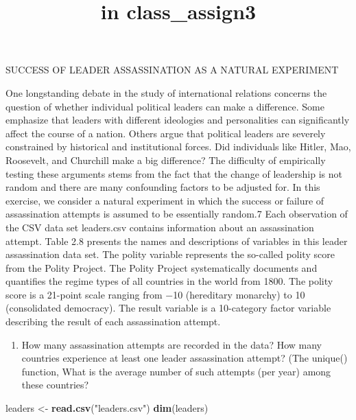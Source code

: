 \documentclass[
]{article}
\title{in class\_assign3}
\author{}
\date{\vspace{-2.5em}}
\newenvironment{Shaded}{\begin{snugshade}}{\end{snugshade}}
\newcommand{\KeywordTok}[1]{\textcolor[rgb]{0.13,0.29,0.53}{\textbf{#1}}}
\newcommand{\NormalTok}[1]{#1}
\newcommand{\StringTok}[1]{\textcolor[rgb]{0.31,0.60,0.02}{#1}}
\providecommand{\tightlist}{%
  \setlength{\itemsep}{0pt}\setlength{\parskip}{0pt}}
\begin{document}
\maketitle

SUCCESS OF LEADER ASSASSINATION AS A NATURAL EXPERIMENT

One longstanding debate in the study of international relations concerns
the question of whether individual political leaders can make a
difference. Some emphasize that leaders with different ideologies and
personalities can significantly affect the course of a nation. Others
argue that political leaders are severely constrained by historical and
institutional forces. Did individuals like Hitler, Mao, Roosevelt, and
Churchill make a big difference? The difficulty of empirically testing
these arguments stems from the fact that the change of leadership is not
random and there are many confounding factors to be adjusted for. In
this exercise, we consider a natural experiment in which the success or
failure of assassination attempts is assumed to be essentially random.7
Each observation of the CSV data set leaders.csv contains information
about an assassination attempt. Table 2.8 presents the names and
descriptions of variables in this leader assassination data set. The
polity variable represents the so-called polity score from the Polity
Project. The Polity Project systematically documents and quantifies the
regime types of all countries in the world from 1800. The polity score
is a 21-point scale ranging from −10 (hereditary monarchy) to 10
(consolidated democracy). The result variable is a 10-category factor
variable describing the result of each assassination attempt.

\begin{enumerate}
\def\labelenumi{\arabic{enumi}.}
\tightlist
\item
  How many assassination attempts are recorded in the data? How many
  countries experience at least one leader assassination attempt? (The
  unique() function, What is the average number of such attempts (per
  year) among these countries?
\end{enumerate}

\begin{Shaded}
\begin{Highlighting}[]
\NormalTok{leaders <-}\StringTok{ }\KeywordTok{read.csv}\NormalTok{(}\StringTok{"leaders.csv"}\NormalTok{)}
\KeywordTok{dim}\NormalTok{(leaders)}
\end{Highlighting}
\end{Shaded}
\end{document}
